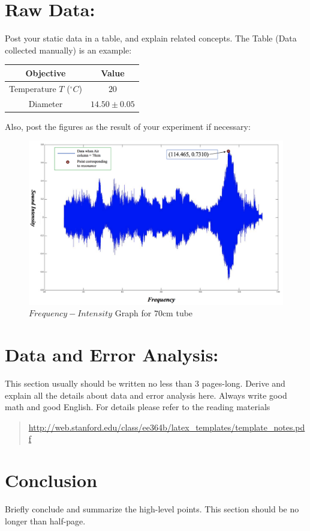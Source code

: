 \section{Raw Data:}
Post your static data in a table, and explain related concepts. The Table (Data collected manually) is an example:
\begin{center}
\begin{tabular}{|c | c|}
\hline
Objective   &  Value \\
\hline
Temperature $T$ ($^{\circ}C$)  &  $20$\\
\hline
Diameter  &  $14.50 \pm0.05$\\
\hline
\end{tabular}
\label{Data collected manually}
\end{center}

Also, post the figures as the result of your experiment if necessary:

\begin{figure}[H]
\centering\includegraphics[width=13cm]{Exp_9_graph}
\caption{$Frequency-Intensity$ Graph for $70$cm tube}
\label{$Frequency-Intensity$ Graph for $70$cm tube}
\end{figure}


\section{Data and Error Analysis:}
This section usually should be written no less than 3 pages-long. Derive and explain all the details about data and error analysis here. Always write good math and good English. For details please refer to the reading materials
\begin{quotation}
\href{http://web.stanford.edu/class/ee364b/latex_templates/template_notes.pdf}{http://web.stanford.edu/class/ee364b/latex\_templates/template\_notes.pdf}
\end{quotation}

\section{Conclusion}
Briefly conclude and summarize the high-level points. This section should be no longer than half-page.


